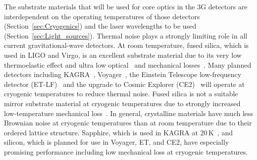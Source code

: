 The substrate materials that will be used for core optics in the 3G detectors are interdependent on the operating temperatures of those detectors (Section~\ref{sec:Cryogenics}) and the laser wavelengths to be used (Section~\ref{sec:Light_sources}). 
Thermal noise plays a strongly limiting role in all current gravitational-wave detectors. At room temperature, fused silica, which is used in LIGO and Virgo, is an excellent substrate material due to its very low thermoelastic effect and ultra low optical~\cite{GEO_Absorption} and mechanical losses~\cite{Ageev_2004}. Many planned detectors
including KAGRA~\cite{KAGRA2013}, Voyager~\cite{VoyagerDCC2018}, the Einstein Telescope low-frequency detector (ET-LF)~\cite{ET2011} and the upgrade to Cosmic Explorer (CE2)~\cite{CosmicExplorer2017} will operate at cryogenic temperatures to reduce thermal noise. 
Fused silica is not a suitable mirror substrate material at cryogenic temperatures due to strongly increased low-temperature mechanical loss~\cite{Travasso_2007}.
In general, crystalline materials have much less Brownian noise at cryogenic temperatures than at room temperature due to their ordered lattice structure.
Sapphire, which is used in KAGRA at 20\,K~\cite{Hirose_2014a}, and silicon, which is planned for use in Voyager, ET, and CE2, have especially promising performance including low mechanical loss at cryogenic temperatures. 

